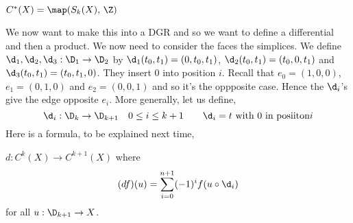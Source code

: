 \begin{ndefi}
  $C^*(X) = \map(S_k(X),\, \Z)$
\end{ndefi}

\noindent
We now want to make this into a DGR and so we want to define a differential and then a product. We now need to consider the faces the simplices. We define $\d_1, \d_2, \d_3 : \D_1 \to \D_2$ by $\d_1(t_0, t_1) = (0, t_0, t_1)$, $\d_2(t_0, t_1) = (t_0, 0, t_1)$ and $\d_3(t_0, t_1) = (t_0, t_1, 0)$. They insert $0$ into position $i$. Recall that $e_0 = (1, 0, 0)$, $e_1 = (0, 1, 0)$ and $e_2 = (0, 0, 1)$ and so it's the oppposite case. Hence the $\d_i$'s give the edge opposite $e_i$. More generally, let us define,
$$ \d_i : \D_k \to \D_{k+1} \quad 0 \le i \le k+1 \qquad \d_i = t \text{ with $0$ in posiiton} i $$
Here is a formula, to be explained next time,
\begin{ndefi}[]
  $d : C^k(X) \to C^{k+1}(X)$ where
  $$ (df)(u) = \sum_{i=0}^{n+1} (-1)^i f(u \circ \d_i) $$
  for all $u : \D_{k+1} \to X$.
\end{ndefi}